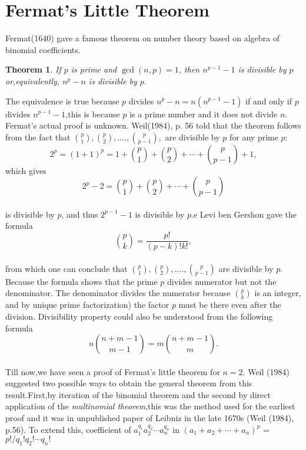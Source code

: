 \documentclass[a4paper,reqno,11pt]{amsart}
\theoremstyle{plain}%
\newtheorem*{thm}{Theorem}
\theoremstyle{definition}
\theoremstyle{remark}
\begin{document}
\section{Fermat’s Little Theorem}
Fermat(1640) gave a famous theorem on number theory based on algebra of binomial coefficients.\\
\begin{thm}\label{thm:Type 1}If $p$ is prime and $\gcd(n, p) = 1$, then $n^{p-1} - 1$ is divisible by $p$ or,equivalently, $n^p - n$ is divisible by $p$.\\
\end{thm}
The equivalence is true because $p$ divides $n^p - n = n(n^{p-1} - 1)$
if and only if $p$ divides $n^{p-1} - 1$,this is because $p$ is a prime number and it does not divide $n$. Fermat's actual proof is unknown. Weil(1984), p. 56 told that the theorem follows from the fact that $\binom{p}{1},\binom{p}{2},....,\binom{p}{p-1},$ are divisible by $p$ for any prime $p$:\\
$$2^p = (1+1)^p = 1 + \binom{p}{1} + \binom{p}{2} + \cdots + \binom{p}{p-1} + 1, $$
which gives\\
$$2^p - 2 = \binom{p}{1} + \binom{p}{2} + \cdots + \binom{p}{p-1} $$\\
is divisible by $p$, and thus $2^{p-1} -1 $ is divisible by $p$.e Levi ben Gershon gave the formula\\
$$\binom{p}{k} = \frac{p!}{(p-k)!k!},$$
\\
from which one can conclude that $\binom{p}{1},\binom{p}{2},....,\binom{p}{p-1}$ are divisible by $p$.
Because the formula shows that the prime $p$ divides numerator but not the
denominator. The denominator divides the numerator because $\binom{p}{k}$
is an integer, and by unique prime factorization) the factor $p$ must
be there even after the division. Divisibility property could also be understood from the following formula\\
$$n\binom{n+m-1}{m-1} = m\binom{n+m-1}{m}.$$
\\
Till now,we have seen a proof of Fermat’s little theorem for $n = 2$. Weil
(1984) suggested two possible ways to obtain the general theorem from this result.First,by iteration of the binomial theorem and the second by
direct application of the \textit{multinomial theorem},this was the method used for the earliest proof and it was in unpublished paper of Leibniz in the late 1670s (Weil (1984), p.56). To extend this,
coefficient of $a_{1}^{q_{1}}a_{2}^{q_{2}}\cdots a_{n}^{q_{n}}$ in $(a_{1} + a_{2} + \cdots + a_{n})^p$ = $p!/q_{1}!q_{2}!\cdots q_{n}!$
\end{document}
